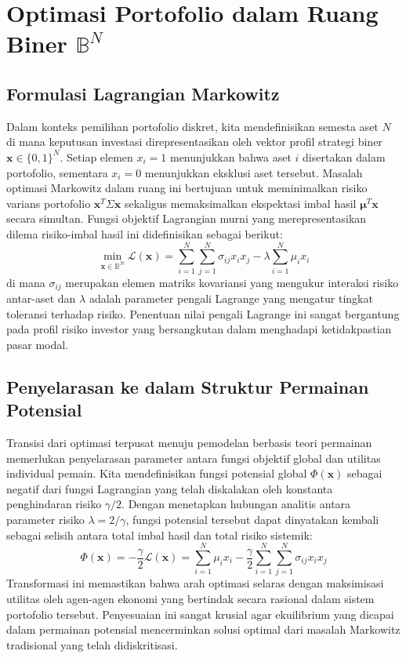 \section{Optimasi Portofolio dalam Ruang Biner $\mathbb{B}^N$}

\subsection{Formulasi Lagrangian Markowitz}
Dalam konteks pemilihan portofolio diskret, kita mendefinisikan semesta aset $N$ di mana keputusan investasi direpresentasikan oleh vektor profil strategi biner $\mathbf{x} \in \{0, 1\}^N$. Setiap elemen $x_i = 1$ menunjukkan bahwa aset $i$ disertakan dalam portofolio, sementara $x_i = 0$ menunjukkan eksklusi aset tersebut. Masalah optimasi Markowitz dalam ruang ini bertujuan untuk meminimalkan risiko varians portofolio $\mathbf{x}^T \Sigma \mathbf{x}$ sekaligus memaksimalkan ekspektasi imbal hasil $\bm{\mu}^T \mathbf{x}$ secara simultan. Fungsi objektif Lagrangian murni yang merepresentasikan dilema risiko-imbal hasil ini didefinisikan sebagai berikut:
\begin{equation}
    \min_{\mathbf{x} \in \mathbb{B}^N} \mathcal{L}(\mathbf{x}) = \sum_{i=1}^N \sum_{j=1}^N \sigma_{ij} x_i x_j - \lambda \sum_{i=1}^N \mu_i x_i
\end{equation}
di mana $\sigma_{ij}$ merupakan elemen matriks kovariansi yang mengukur interaksi risiko antar-aset dan $\lambda$ adalah parameter pengali Lagrange yang mengatur tingkat toleransi terhadap risiko. Penentuan nilai pengali Lagrange ini sangat bergantung pada profil risiko investor yang bersangkutan dalam menghadapi ketidakpastian pasar modal.

\subsection{Penyelarasan ke dalam Struktur Permainan Potensial}
Transisi dari optimasi terpusat menuju pemodelan berbasis teori permainan memerlukan penyelarasan parameter antara fungsi objektif global dan utilitas individual pemain. Kita mendefinisikan fungsi potensial global $\Phi(\mathbf{x})$ sebagai negatif dari fungsi Lagrangian yang telah diskalakan oleh konstanta penghindaran risiko $\gamma/2$. Dengan menetapkan hubungan analitis antara parameter risiko $\lambda = 2/\gamma$, fungsi potensial tersebut dapat dinyatakan kembali sebagai selisih antara total imbal hasil dan total risiko sistemik:
\begin{equation}
    \Phi(\mathbf{x}) = -\frac{\gamma}{2} \mathcal{L}(\mathbf{x}) = \sum_{i=1}^N \mu_i x_i - \frac{\gamma}{2} \sum_{i=1}^N \sum_{j=1}^N \sigma_{ij} x_i x_j
\end{equation}
Transformasi ini memastikan bahwa arah optimasi selaras dengan maksimisasi utilitas oleh agen-agen ekonomi yang bertindak secara rasional dalam sistem portofolio tersebut. Penyesuaian ini sangat krusial agar ekuilibrium yang dicapai dalam permainan potensial mencerminkan solusi optimal dari masalah Markowitz tradisional yang telah didiskritisasi.

